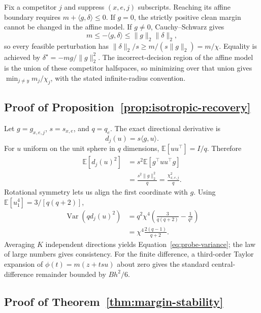\documentclass[11pt]{article}
\newcommand{\E}{\mathbb E}
\begin{document}
Fix a competitor \(j\) and suppress \((x,e,j)\) subscripts. Reaching its
affine boundary requires \(m+\langle g,\delta\rangle\le0\). If \(g=0\), the
strictly positive clean margin cannot be changed in the affine model. If
\(g\ne0\), Cauchy--Schwarz gives
\begin{equation}
    m\le-\langle g,\delta\rangle
    \le\|g\|_2\|\delta\|_2,
\end{equation}
so every feasible perturbation has
\(\|\delta\|_2/s\ge m/(s\|g\|_2)=m/\chi\). Equality is achieved by
\(\delta^\star=-m g/\|g\|_2^2\). The incorrect-decision region of the affine
model is the union of these competitor halfspaces, so minimizing over that
union gives \(\min_{j\ne y}m_j/\chi_j\), with the stated infinite-radius
convention.

\subsection{Proof of Proposition~\ref{prop:isotropic-recovery}}

Let $g=g_{x,e,j}$, $s=s_{x,e}$, and $q=q_e$. The exact directional derivative is
\begin{equation}
    d_j(u)=s\langle g,u\rangle.
\end{equation}
For $u$ uniform on the unit sphere in $q$ dimensions,
$\E[uu^\top]=I/q$. Therefore
\begin{align}
    \E[d_j(u)^2]
    &=s^2\E[g^\top uu^\top g]\\
    &=\frac{s^2\|g\|_2^2}{q}
    =\frac{\chi_{x,e,j}^2}{q}.
\end{align}
Rotational symmetry lets us align the first coordinate with \(g\). Using
\(\E[u_1^4]=3/[q(q+2)]\),
\begin{align}
    \operatorname{Var}\!\left(qd_j(u)^2\right)
    &=q^2\chi^4
    \left(\frac{3}{q(q+2)}-\frac{1}{q^2}\right)\\
    &=\chi^4\frac{2(q-1)}{q+2}.
\end{align}
Averaging \(K\) independent directions yields
Equation~\eqref{eq:probe-variance}; the law of large numbers gives consistency.
For the finite difference, a third-order Taylor expansion of
\(\phi(t)=m(z+tsu)\) about zero gives the standard central-difference remainder
bounded by \(Bh^2/6\).

\subsection{Proof of Theorem~\ref{thm:margin-stability}}
\end{document}
